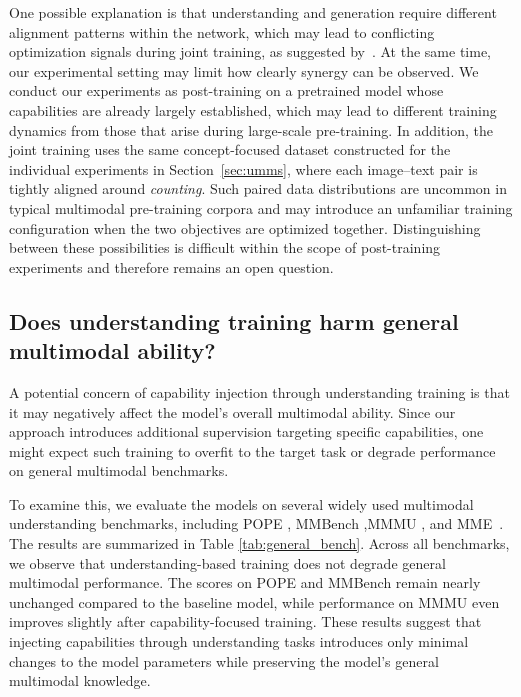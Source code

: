 One possible explanation is that understanding and generation require different alignment patterns within the network, which may lead to conflicting optimization signals during joint training, as suggested by~\cite{li2025unifork}. At the same time, our experimental setting may limit how clearly synergy can be observed. We conduct our experiments as post-training on a pretrained model whose capabilities are already largely established, which may lead to different training dynamics from those that arise during large-scale pre-training. In addition, the joint training uses the same concept-focused dataset constructed for the individual experiments in Section~\ref{sec:umms}, where each image–text pair is tightly aligned around \textit{counting}. Such paired data distributions are uncommon in typical multimodal pre-training corpora and may introduce an unfamiliar training configuration when the two objectives are optimized together. Distinguishing between these possibilities is difficult within the scope of post-training experiments and therefore remains an open question.

\subsection{Does understanding training harm general multimodal ability?}


A potential concern of capability injection through understanding training is that it may negatively affect the model’s overall multimodal ability. Since our approach introduces additional supervision targeting specific capabilities, one might expect such training to overfit to the target task or degrade performance on general multimodal benchmarks.

To examine this, we evaluate the models on several widely used multimodal understanding benchmarks, including POPE \cite{li2023pope}, MMBench \cite{liu2024mmbench},MMMU \cite{yue2024mmmu}, and MME~\cite{fu2023mme}. The results are summarized in Table \ref{tab:general_bench}. Across all benchmarks, we observe that understanding-based training does not degrade general multimodal performance. The scores on POPE and MMBench remain nearly unchanged compared to the baseline model, while performance on MMMU even improves slightly after capability-focused training. These results suggest that injecting capabilities through understanding tasks introduces only minimal changes to the model parameters while preserving the model’s general multimodal knowledge. 



